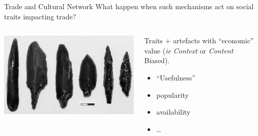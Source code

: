 \documentclass[12pt, notes=show]{beamer}
\begin{document}
\begin{frame}{Trade and Cultural Network}
		What happen when such mechanisms act on social traits impacting trade?
	\begin{columns}
		\begin{column}{.4\textwidth}
			\includegraphics[width=\textwidth]{images/obsidianFlint.jpg}	
		\end{column}
		\begin{column}{.5\textwidth}
			\small
			Traits $+$ artefacts with ``economic'' value (\emph{ie}  \textit{Context} or \textit{Content} Biased).
			\begin{itemize}
				\item ``Usefulness''
				\item popularity
				\item availability
				\item \dots
			\end{itemize}
		\end{column}
	\end{columns}
\end{frame}

\end{document}
